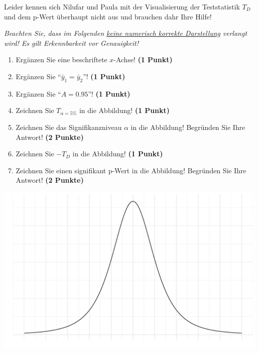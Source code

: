 \documentclass[a4paper, 9pt]{scrartcl}\usepackage[]{graphicx}\usepackage[]{xcolor}
\makeatletter
\def\maxwidth{ %
  \ifdim\Gin@nat@width>\linewidth
    \linewidth
  \else
    \Gin@nat@width
  \fi
}
\makeatother
\begin{document}
\vspace{1ex}

Leider kennen sich Nilufar und Paula mit der Visualisierung der Teststatistik $T_D$ und dem p-Wert überhaupt nicht aus und brauchen dahr Ihre Hilfe!

\vspace{1ex}

\textit{Beachten Sie, dass im Folgenden \underline{keine numerisch korrekte Darstellung} verlangt wird! Es gilt Erkennbarkeit vor Genauigkeit!}

\begin{enumerate}
\item Ergänzen Sie eine beschriftete $x$-Achse! \textbf{(1 Punkt)}
\item Ergänzen Sie "`$\bar{y}_1 = \bar{y}_2$"'! \textbf{(1 Punkt)} 
\item Ergänzen Sie "`$A = 0.95$"'! \textbf{(1 Punkt)}
\item Zeichnen Sie $T_{\alpha=5\%}$ in die Abbildung! \textbf{(1 Punkt)} 
\item Zeichnen Sie das Signifikanzniveau $\alpha$ in die Abbildung! Begründen Sie Ihre Antwort! \textbf{(2 Punkte)} 
\item Zeichnen Sie $-T_{D}$ in die Abbildung! \textbf{(1 Punkt)}
\item Zeichnen Sie einen signifikant p-Wert in die Abbildung! Begründen Sie Ihre Antwort! \textbf{(2 Punkte)}   
\end{enumerate}



{\centering \includegraphics[width=\maxwidth]{img/statistisches-testen-3-1} 

}


 
\clearpage
\end{document}

